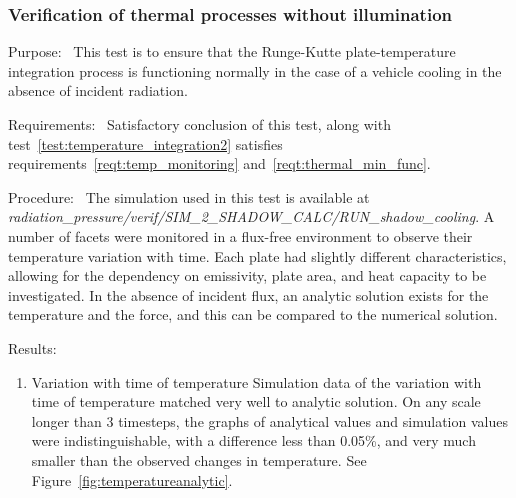   \subsubsection{Verification of thermal processes without illumination}
  \label{test:temperature_integration1}
  \begin{description}
  \item{Purpose:}\ \newline
    This test is to ensure that the Runge-Kutte plate-temperature integration
    process is functioning normally in the case of a vehicle cooling in the
    absence of incident radiation.
  \item{Requirements:}\ \newline
    Satisfactory conclusion of this test, along with test~\ref{test:temperature_integration2} satisfies requirements~\ref{reqt:temp_monitoring} and~\ref{reqt:thermal_min_func}.
  \item{Procedure:}\ \newline
    The simulation used in this test is available at \newline
    \textit{radiation\_pressure/verif/SIM\_2\_SHADOW\_CALC/RUN\_shadow\_cooling}.
    A number of facets were monitored in a flux-free environment to observe
    their temperature variation with time.  Each plate had
    slightly different characteristics, allowing for the dependency on
    emissivity, plate area, and heat capacity to be investigated.  In the
    absence of incident flux, an analytic solution exists for the temperature
    and the force, and this can be compared to the numerical solution.
  \item{Results:}
    \begin{enumerate}
    \item{Variation with time of temperature}\newline
      Simulation data of the variation with time of temperature matched very well to analytic solution.  On any scale
      longer than 3 timesteps, the graphs of analytical values and simulation
      values were indistinguishable, with a difference less than 0.05\%, and
      very much smaller than the observed changes in temperature.  See Figure~\ref{fig:temperatureanalytic}.
      \begin{figure}[!ht]

\end{figure}
\end{enumerate}
\end{description}
